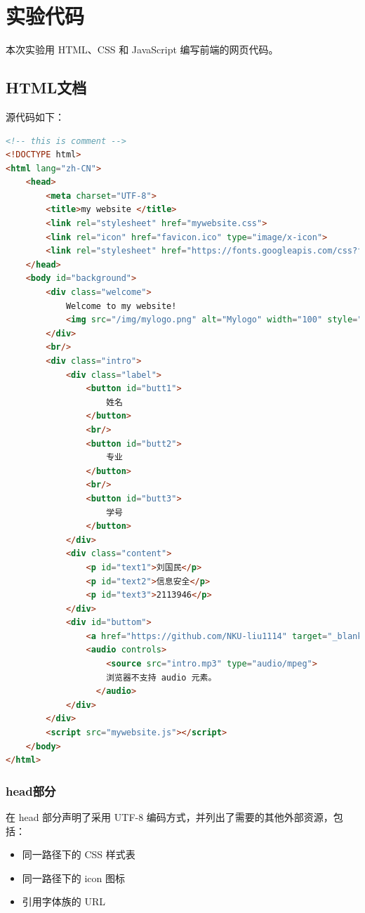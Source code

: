 \documentclass[UTF8,a4paper,10pt]{ctexart}
\begin{document}
\section{实验代码}

本次实验用 HTML、CSS 和 JavaScript 编写前端的网页代码。

\subsection{HTML文档}
源代码如下：
\begin{lstlisting}[frame=trbl,language={HTML}]
<!-- this is comment -->
<!DOCTYPE html>
<html lang="zh-CN">
    <head>
        <meta charset="UTF-8">
        <title>my website </title>
        <link rel="stylesheet" href="mywebsite.css">
        <link rel="icon" href="favicon.ico" type="image/x-icon">
        <link rel="stylesheet" href="https://fonts.googleapis.com/css?family=Sofia">
    </head>
    <body id="background">
        <div class="welcome">
            Welcome to my website!
            <img src="/img/mylogo.png" alt="Mylogo" width="100" style="margin-left: 80px;" >
        </div>
        <br/>
        <div class="intro">
            <div class="label">
                <button id="butt1">
                    姓名
                </button>
                <br/>
                <button id="butt2">
                    专业
                </button>
                <br/>
                <button id="butt3">
                    学号
                </button>
            </div>
            <div class="content">
                <p id="text1">刘国民</p>
                <p id="text2">信息安全</p>
                <p id="text3">2113946</p>
            </div>
            <div id="buttom">
                <a href="https://github.com/NKU-liu1114" target="_blank">github账号个人主页</a>
                <audio controls>
                    <source src="intro.mp3" type="audio/mpeg">
                    浏览器不支持 audio 元素。
                  </audio>
            </div>     
        </div>
        <script src="mywebsite.js"></script>
    </body>
</html>
\end{lstlisting}\par

\subsubsection{head部分}

在 head 部分声明了采用 UTF-8 编码方式，并列出了需要的其他外部资源，包括：
\begin{itemize}
\item 同一路径下的 CSS 样式表
\item 同一路径下的 icon 图标
\item 引用字体族的 URL
\end{itemize}
\end{document}
